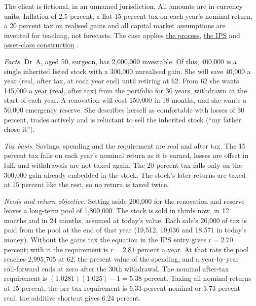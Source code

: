 \begin{qfexample}\label{ex:investment-planning-case}
 The client is fictional, in an unnamed jurisdiction. All amounts are in currency units. Inflation of 2.5 percent, a flat 15 percent tax on each year's nominal return, a 20 percent tax on realised gains and all capital market assumptions are invented for teaching, not forecasts. The case applies \hyperref[def:portfolio-management-process]{the process}, \hyperref[meth:investment-policy-statement]{the IPS} and \hyperref[meth:asset-class-portfolio-construction]{asset-class construction} \citep[method from][chap.~1, pp.~11--17, and chap.~5, pp.~231--232]{managing-investment-portfolios-2007}.

\emph{Facts.} Dr~A, aged 50, surgeon, has 2{,}000{,}000 investable. Of this, 400{,}000 is a single inherited listed stock with a 300{,}000 unrealised gain. She will save 40{,}000 a year (real, after tax, at each year end) until retiring at 62. From 62 she wants 145{,}000 a year (real, after tax) from the portfolio for 30 years, withdrawn at the start of each year. A renovation will cost 150{,}000 in 18 months, and she wants a 50{,}000 emergency reserve. She describes herself as comfortable with losses of 30 percent, trades actively and is reluctant to sell the inherited stock (``my father chose it'').

 \emph{Tax basis.} Savings, spending and the requirement are real and after tax. The 15 percent tax falls on each year's nominal return as it is earned, losses are offset in full, and withdrawals are not taxed again. The 20 percent tax falls only on the 300{,}000 gain already embedded in the stock. The stock's later returns are taxed at 15 percent like the rest, so no return is taxed twice.

\emph{Needs and return objective.} Setting aside 200{,}000 for the renovation and reserve leaves a long-term pool of 1{,}800{,}000. The stock is sold in thirds now, in 12 months and in 24 months, assumed at today's value. Each sale's 20{,}000 of tax is paid from the pool at the end of that year (19{,}512, 19{,}036 and 18{,}571 in today's money). Without the gains tax the equation in the IPS entry gives $r=2.70$ percent; with it the requirement is $r=2.81$ percent a year. At that rate the pool reaches 2{,}995{,}705 at 62, the present value of the spending, and a year-by-year roll-forward ends at zero after the 30th withdrawal. The nominal after-tax requirement is $(1.0281)(1.025)-1=5.38$ percent. Taxing all nominal returns at 15 percent, the pre-tax requirement is 6.33 percent nominal or 3.73 percent real; the additive shortcut gives 6.24 percent.


\end{qfexample}
